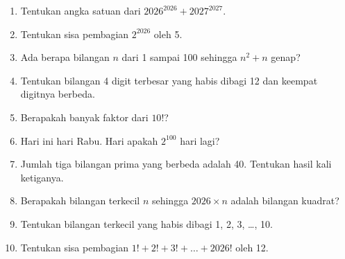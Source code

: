 \documentclass[11pt,a4paper]{article}
\begin{document}
\begin{enumerate}
    \item Tentukan angka satuan dari $2026^{2026} + 2027^{2027}$.
    \item Tentukan sisa pembagian $2^{2026}$ oleh 5.
    \item Ada berapa bilangan $n$ dari 1 sampai 100 sehingga $n^2 + n$ genap?
    \item Tentukan bilangan 4 digit terbesar yang habis dibagi 12 dan keempat digitnya berbeda.
    \item Berapakah banyak faktor dari $10!$?
    \item Hari ini hari Rabu. Hari apakah $2^{100}$ hari lagi?
    \item Jumlah tiga bilangan prima yang berbeda adalah 40. Tentukan hasil kali ketiganya.
    \item Berapakah bilangan terkecil $n$ sehingga $2026 \times n$ adalah bilangan kuadrat?
    \item Tentukan bilangan terkecil yang habis dibagi 1, 2, 3, \dots, 10.
    \item Tentukan sisa pembagian $1! + 2! + 3! + \dots + 2026!$ oleh 12.
\end{enumerate}
\end{document}
